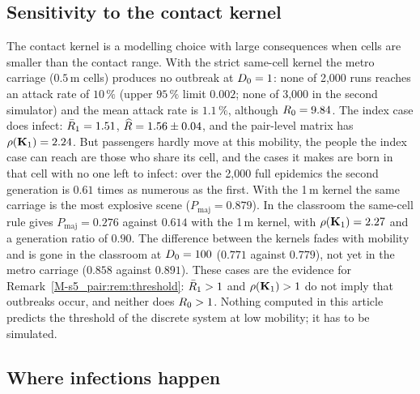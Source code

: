 \subsection{Sensitivity to the contact kernel}\label{s6_scenes:sec:kernel}

The contact kernel is a modelling choice with large consequences when cells are smaller than the contact range.
With the strict same-cell kernel the metro carriage ($0.5$\,m cells) produces no outbreak at
$D_0=1$: none of 2{,}000 runs reaches an attack rate of $10\,\%$ (upper $95\,\%$ limit $0.002$; none of 3{,}000 in the
second simulator) and the mean attack rate is $1.1\,\%$, although $R_0=9.84$.
The index case does infect: $\bar{R}_1=1.51$, $\widehat{R}=1.56\pm0.04$, and the pair-level matrix has
$\rho(\mathbf{K}_1)=2.24$. But passengers hardly move at this mobility, the people the index case can reach are those
who share its cell, and the cases it makes are born in that cell with no one left to infect: over the 2{,}000
full epidemics the second generation is $0.61$ times as numerous as the first.
With the 1\,m kernel the same carriage is the most explosive scene ($P_{\mathrm{maj}}=0.879$). In the classroom
the same-cell rule gives $P_{\mathrm{maj}}=0.276$ against $0.614$ with the 1\,m kernel, with
$\rho(\mathbf{K}_1)=2.27$ and a generation ratio of $0.90$. The difference between the kernels fades with mobility
and is gone in the classroom at $D_0=100$ ($0.771$ against $0.779$), not yet in the metro carriage ($0.858$
against $0.891$).
These cases are the evidence for Remark~\ref{M-s5_pair:rem:threshold}: $\bar{R}_1>1$ and $\rho(\mathbf{K}_1)>1$ do not
imply that outbreaks occur, and neither does $R_0>1$. Nothing computed in this article predicts the threshold
of the discrete system at low mobility; it has to be simulated.

\subsection{Where infections happen}

